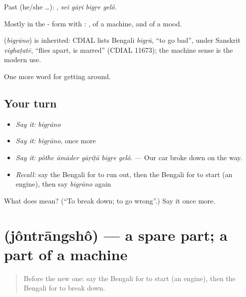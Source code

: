 Past (he/she …):    , \emph{sei gāṛi bigṛe gelô}.

Mostly in the - form with :  , of a machine, and of a mood.

\begin{cousinweb}
\textbf{} (\emph{bigṛāno}) is inherited: CDIAL lists Bengali \emph{bigṛā}, \textquotedblleft{}to go bad\textquotedblright{}, under Sanskrit \emph{vighaṭatē}, \textquotedblleft{}flies apart, is marred\textquotedblright{} (CDIAL 11673); the machine sense is the modern use.
\end{cousinweb}

\begin{grammarlens}[title={What you've built}]
One more word for getting around.
\end{grammarlens}

\subsection*{Your turn}
\begin{itemize}
\raggedright
  \item \emph{Say it:} \emph{bigṛāno}
  \item \emph{Say it:} \emph{bigṛāno}, once more
  \item \emph{Say it:} \emph{pôthe āmāder gāṛiṭā bigṛe gelô.} — Our car broke down on the way.
  \item \emph{Recall:} say the Bengali for to run out, then the Bengali for to start (an engine), then say \emph{bigṛāno} again
\end{itemize}

\begin{tcolorbox}[breakable,colback=teal!4,colframe=teal!35!black,title={Before you move on}]
What does  mean? (\textquotedblleft{}To break down; to go wrong\textquotedblright{}.) Say it once more.
\end{tcolorbox}
\section[\texorpdfstring{\bn{যন্ত্রাংশ} (jôntrāngshô)}{যন্ত্রাংশ (jôntrāngshô)}]{ (jôntrāngshô) — a spare part; a part of a machine}

\label{lesson:BN-C394-jontrangsho}



\begin{quote}
Before the new one: say the Bengali for to start (an engine), then the Bengali for to break down.
\end{quote}

